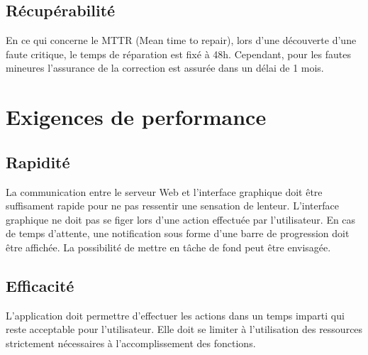 		\subsection{Récupérabilité}
		En ce qui concerne le MTTR (Mean time to repair), lors d'une découverte d'une faute critique, le temps de réparation est fixé à 48h. Cependant, pour les fautes mineures l'assurance de la correction est assurée dans un délai de 1 mois.
	
		
		
		
		
	\section{Exigences de performance}
	

	
		
		\subsection{Rapidité}

		La communication entre le serveur Web et l'interface graphique doit être suffisament rapide pour ne pas ressentir une sensation de lenteur. L'interface graphique ne doit pas se figer lors d'une action effectuée par l'utilisateur.
		En cas de temps d'attente, une notification sous forme d'une barre de progression doit être affichée. La possibilité de mettre en tâche de fond peut être envisagée.

		\subsection{Efficacité}		
		L'application doit permettre d'effectuer les actions dans un temps imparti qui reste acceptable pour l'utilisateur. Elle doit se limiter à l'utilisation des ressources strictement nécessaires à l'accomplissement des fonctions.
		
